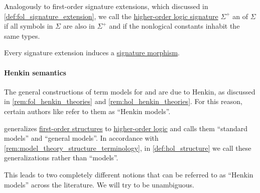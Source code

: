 \begin{definition}\label{def:hol_signature_extension}\mimprovised
  Analogously to first-order signature extensions, which discussed in \cref{def:fol_signature_extension}, we call the \hyperref[def:hol_signature]{higher-order logic signature} \( \Sigma^+ \) an  of \( \Sigma \) if all symbols in \( \Sigma \) are also in \( \Sigma^+ \) and if the nonlogical constants inhabit the same types.
\end{definition}
\begin{comments}
  \item Every signature extension induces a \hyperref[def:hol_signature_category]{signature morphism}.
\end{comments}

\paragraph{Henkin semantics}

\begin{remark}\label{rem:henkin_semantics}
  The general constructions of term models for  and  are due to Henkin, as discussed in \cref{rem:fol_henkin_theories} and \cref{rem:hol_henkin_theories}. For this reason, certain authors like \cite[xii]{Hinman2005Logic} refer to them as \enquote{Henkin models}.

  \Textcite{Henkin1950CompletenessInTheoryOfTypes} generalizes \hyperref[def:fol_structure]{first-order structures} to \hyperref[def:higher_order_logic]{higher-order logic} and calls them \enquote{standard models} and \enquote{general models}. In accordance with \cref{rem:model_theory_structure_terminology}, in \cref{def:hol_structure} we call these generalizations  rather than \enquote{models}.

  This leads to two completely different notions that can be referred to as \enquote{Henkin models} across the literature. We will try to be unambiguous.
\end{remark}


